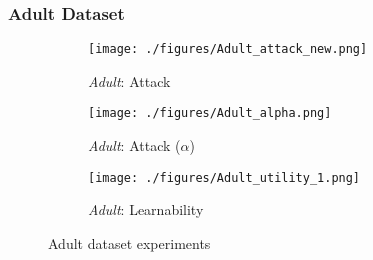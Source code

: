 \subsubsection{Adult Dataset}
\label{app:adult experiments}
\begin{figure*}[ht]
    \begin{subfigure}[b]{0.33\linewidth}\centering
        \texttt{[image: ./figures/Adult\_attack\_new.png]}
        \caption{\textit{Adult}: Attack }%
        \label{fig:Adult:attack}
    \end{subfigure}
    \begin{subfigure}[b]{0.33\linewidth}\centering
    \texttt{[image: ./figures/Adult\_alpha.png]}
        \caption{\textit{Adult}: Attack ($\alpha$)}
        \label{fig:Adult:alpha}
    \end{subfigure}
    \begin{subfigure}[b]{0.33\linewidth}\centering
   \texttt{[image: ./figures/Adult\_utility\_1.png]}
        \caption{\textit{Adult}: Learnability}
        \label{fig:Adult:utility}
    \end{subfigure}
        \caption{Adult dataset experiments}
        \label{fig: adult experiments}
\end{figure*}






